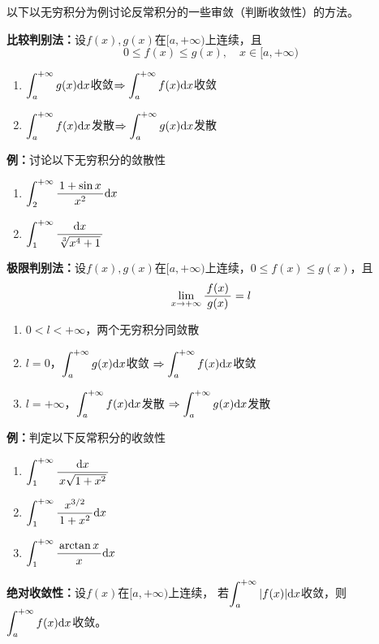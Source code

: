 以下以无穷积分为例讨论反常积分的一些审敛（判断收敛性）的方法。

\begin{thx}
	{\bf 比较判别法：}设$f(x),g(x)$在$[a,+\infty)$上连续，且
	$$0\leq f(x)\leq g(x),\quad x\in[a,+\infty)$$ 
	\begin{enumerate}[(1)]
	  \item
	  $\displaystyle\int_a^{+\infty}g(x)\mathrm{d} x$收敛$\Rightarrow\displaystyle\int_a^{+\infty}f(x)\mathrm{d} x$收敛 
	  \item $\displaystyle\int_a^{+\infty}f(x)\mathrm{d} x$发散$\Rightarrow\displaystyle\int_a^{+\infty}g(x)\mathrm{d} x$发散
	\end{enumerate}
\end{thx}

{\bf 例：}讨论以下无穷积分的敛散性
\begin{enumerate}[(1)]
  \setlength{\itemindent}{1cm}
  \item $\displaystyle\int_2^{+\infty}\displaystyle\frac{\,{1+\sin x}\,}{\,{x^2}\,}\mathrm{d} x$ 
  \item $\displaystyle\int_1^{+\infty}\displaystyle\frac{\,{\mathrm{d} x}\,}{\,{\sqrt[3]{x^4+1}}\,}$
\end{enumerate}

\begin{thx}
	{\bf 极限判别法：}设$f(x),g(x)$在$[a,+\infty)$上连续，$0\leq f(x)\leq g(x)$，且
	$$\lim\limits_{x\to{+\infty}}\displaystyle\frac{\,{f(x)}\,}{\,{g(x)}\,}=l$$ 
	\begin{enumerate}[(1)]
	  \item $0<l<+\infty$，两个无穷积分同敛散 
	  \item
	  $l=0$，$\displaystyle\int_a^{+\infty}g(x)\mathrm{d} x$收敛
	  $\Rightarrow\displaystyle\int_a^{+\infty}f(x)\mathrm{d} x$收敛 
	  \item
	  $l=+\infty$，$\displaystyle\int_a^{+\infty}f(x)\mathrm{d} x$发散
	  $\Rightarrow\displaystyle\int_a^{+\infty}g(x)\mathrm{d} x$发散
	\end{enumerate}
\end{thx}

{\bf 例：}判定以下反常积分的收敛性
\begin{enumerate}[(1)]
  \setlength{\itemindent}{1cm}
  \item $\displaystyle\int_1^{+\infty}\displaystyle\frac{\,{\mathrm{d} x}\,}{\,{x\sqrt{1+x^2}}\,}$ 
  \item $\displaystyle\int_1^{+\infty}\displaystyle\frac{\,{x^{3/2}}\,}{\,{1+x^2}\,}\mathrm{d} x$ 
  \item $\displaystyle\int_1^{+\infty}\displaystyle\frac{\,{\arctan x}\,}{\,{x}\,}\mathrm{d} x$
\end{enumerate}

\begin{thx}
	{\bf 绝对收敛性：}设$f(x)$在$[a,+\infty)$上连续，
	若$\displaystyle\int_a^{+\infty}|f(x)|\mathrm{d} x$收敛，则
	$\displaystyle\int_a^{+\infty}f(x)\mathrm{d} x$收敛。
\end{thx}

